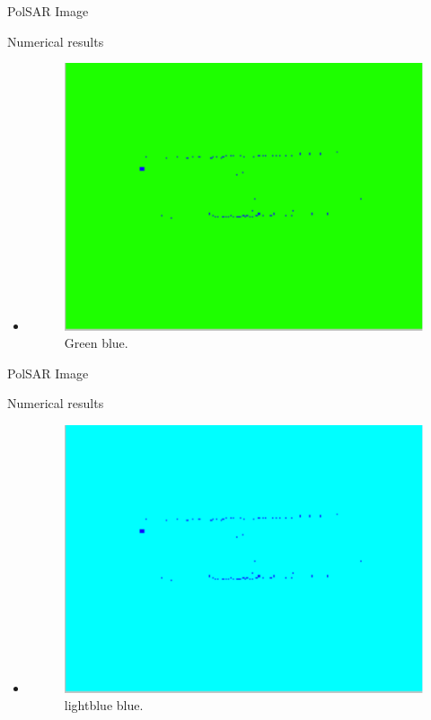 \documentclass[10pt]{beamer}
\begin{document}
\begin{frame}[fragile]{PolSAR Image}
\begin{alertblock}{Numerical results}
\begin{itemize}
	\item 
	\begin{figure}[hbt]
\centering
	\includegraphics[width=.5\linewidth]{flevoland_fusao_roc_crop_teste_green_blue}
	\caption{Green blue.}
\label{flevoland_radial_4look}
\end{figure}
\end{itemize}
\end{alertblock}
\end{frame}


\begin{frame}[fragile]{PolSAR Image}
\begin{alertblock}{Numerical results}
\begin{itemize}
	\item 
	\begin{figure}[hbt]
\centering
	\includegraphics[width=.5\linewidth]{flevoland_fusao_roc_crop_teste_lightblue_blue}
	\caption{lightblue blue.}
\label{flevoland_radial_4look}
\end{figure}
\end{itemize}
\end{alertblock}
\end{frame}
\end{document}
